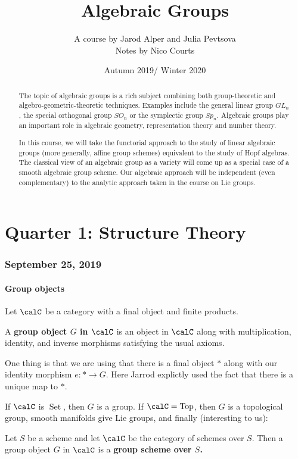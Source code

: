\documentclass[12pt]{article}
\begin{document}
\title{Algebraic Groups\vspace{-1ex}}
\author{A course by Jarod Alper and Julia Pevtsova\\
Notes by Nico Courts}
\date{Autumn 2019/ Winter 2020}
\maketitle

\begin{abstract}
	The topic of algebraic groups is a rich subject combining both group-theoretic and algebro-geometric-theoretic techniques. Examples include the general linear group $GL_n$, 
	the special orthogonal group $SO_n$ or the symplectic group $Sp_n$. Algebraic groups play an important role in algebraic geometry, representation theory and number theory.

	In this course, we will take the functorial approach to the study of linear algebraic groups (more generally, affine group schemes) equivalent to the study of Hopf algebras. 
	The classical view of an algebraic group as a variety will come up as a special case of a smooth algebraic group scheme. Our algebraic approach will be independent (even complementary) to the analytic approach taken in the course on Lie groups.
\end{abstract}

\part{Quarter 1: Structure Theory}
\section{September 25, 2019}
\subsection{Group objects}
Let $\calC$ be a category with a final object and finite products.
\begin{defn}
	A \textbf{group object $G$ in $\calC$} is an object in $\calC$ along with multiplication, identity, and inverse morphisms
	satisfying the usual axioms.
\end{defn}

One thing is that we are using that there is a final object $\ast$ along with our identity morphism $e:\ast\to G$.
Here Jarrod explictly used the fact that there is a unique map to $\ast$.

\begin{ex}
	If $\calC$ is $\operatorname{Set}$, then $G$ is a group. If $\calC=\operatorname{Top}$, then $G$ is a topological group, smooth manifolds give Lie groups, and finally (interesting to us):
\end{ex}
\begin{defn}
	Let $S$ be a scheme and let $\calC$ be the category of schemes over $S$. Then a group object $G$ in $\calC$ is 
	a \textbf{group scheme over $S$.}
\end{defn}
\end{document}
